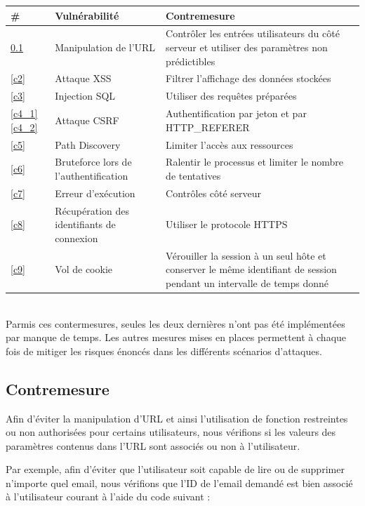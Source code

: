 \documentclass[12pt]{article}
\begin{document}
\begin{tabular}{| p{0.7cm} | p{7.5cm} | p{7.5cm} |}
  \hline			
  \textbf{\# } &\textbf{ Vulnérabilité }& \textbf{Contremesure} \\
  \hline  
  \ref{c1} & Manipulation de l'URL & Contrôler les entrées utilisateurs du côté serveur et utiliser des paramètres non prédictibles \\
  \hline
  \ref{c2} & Attaque XSS & Filtrer l'affichage des données stockées \\
  \hline
  \ref{c3} & Injection SQL & Utiliser des requêtes préparées \\
  \hline
  \ref{c4_1} \ref{c4_2} & Attaque CSRF & Authentification par jeton et par HTTP\_REFERER \\
  \hline
  \ref{c5} & Path Discovery & Limiter l'accès aux ressources \\
  \hline
  \ref{c6} & Bruteforce lors de l'authentification & Ralentir le processus et limiter le nombre de tentatives \\
  \hline
  \ref{c7} & Erreur d'exécution & Contrôles côté serveur \\
  \hline
  \ref{c8} & Récupération des identifiants de connexion & Utiliser le protocole HTTPS \\
  \hline
  \ref{c9} & Vol de cookie & Vérouiller la session à un seul hôte et conserver le même identifiant de session pendant un intervalle de temps donné \\
  \hline
\end{tabular}\\


Parmis ces contermesures, seules les deux dernières n'ont pas été implémentées par manque de temps. Les autres mesures mises en places permettent à chaque fois de mitiger les risques énoncés dans les différents scénarios d'attaques.

\newpage
\subsection{Contremesure}\label{c1}

Afin d'éviter la manipulation d'URL et ainsi l'utilisation de fonction restreintes ou non authorisées pour certains utilisateurs, nous vérifions si les valeurs des paramètres contenus dans l'URL sont associés ou non à l'utilisateur. 

Par exemple, afin d'éviter que l'utilisateur soit capable de lire ou de supprimer n'importe quel email, nous vérifions que l'ID de l'email demandé est bien associé à l'utilisateur courant à l'aide du code suivant : 
\end{document}
